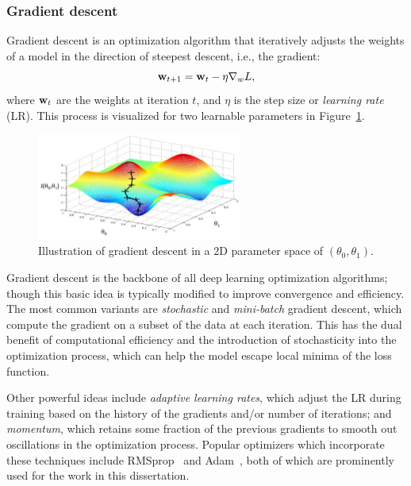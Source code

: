 \subsubsection{Gradient descent}

Gradient descent is an optimization algorithm that iteratively adjusts the weights of a model in the direction of steepest descent, i.e., the gradient:
\begin{equation}
    \label{eq:03_ml_grad_desc}
    \mathbf{w}_{t+1} = \mathbf{w}_t - \eta \nabla_w L,
\end{equation}
where $\mathbf{w}_t$ are the weights at iteration $t$, and $\eta$ is the step size or \textit{learning rate} (LR).
This process is visualized for two learnable parameters in Figure~\ref{fig:03_ml_gradientdescent}.

\begin{figure}[ht]
    \centering
    \includegraphics[width=0.6\textwidth]{figures/03-ML/gradientdescent}
    \caption{Illustration of gradient descent in a 2D parameter space of $(\theta_0, \theta_1)$.}
    \label{fig:03_ml_gradientdescent}
\end{figure}

Gradient descent is the backbone of all deep learning optimization algorithms; though this basic idea is typically modified to improve convergence and efficiency.
The most common variants are \textit{stochastic} and \textit{mini-batch} gradient descent, which compute the gradient on a subset of the data at each iteration.
This has the dual benefit of computational efficiency and the introduction of stochasticity into the optimization process, which can help the model escape local minima of the loss function.

Other powerful ideas include \textit{adaptive learning rates}, which adjust the LR during training based on the history of the gradients and/or number of iterations; and \textit{momentum}, which retains some fraction of the previous gradients to smooth out oscillations in the optimization process.
Popular optimizers which incorporate these techniques include RMSprop~\cite{hinton2012rmsprop} and Adam~\cite{kingma2015adam}, both of which are prominently used for the work in this dissertation.

